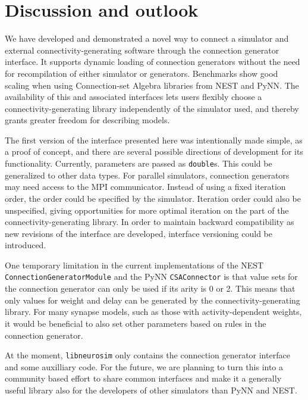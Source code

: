 \documentclass{frontiersSCNS} %
\begin{document}

\section{Discussion and outlook}

We have developed and demonstrated a novel way to connect a simulator
and external connectivity-generating software through the connection
generator interface. It supports dynamic loading of connection
generators without the need for recompilation of either simulator or
generators. Benchmarks show good scaling when using Connection-set
Algebra libraries from NEST and PyNN. The availability of this and
associated interfaces lets users flexibly choose a
connectivity-generating library independently of the simulator used,
and thereby grants greater freedom for describing models.

The first version of the interface presented here was intentionally
made simple, as a proof of concept, and there are several possible
directions of development for its functionality. Currently, parameters
are passed as \verb|double|s. This could be generalized to other data
types.  For parallel simulators, connection generators may need access
to the MPI communicator.  Instead of using a fixed iteration order,
the order could be specified by the simulator. Iteration order could
also be unspecified, giving opportunities for more optimal iteration
on the part of the connectivity-generating library.  In order to
maintain backward compatibility as new revisions of the interface are
developed, interface versioning could be introduced.

One temporary limitation in the current implementations of the NEST
\verb|ConnectionGeneratorModule| and the PyNN \verb|CSAConnector| is
that value sets for the connection generator can only be used if its
arity is 0 or 2. This means that only values for weight and delay can
be generated by the connectivity-generating library. For many synapse
models, such as those with activity-dependent weights, it would be
beneficial to also set other parameters based on rules in the
connection generator.

At the moment, \verb|libneurosim| only contains the connection
generator interface and some auxilliary code. For the future, we are
planning to turn this into a community based effort to share common
interfaces and make it a generally useful library also for the
developers of other simulators than PyNN and NEST.
\end{document}
